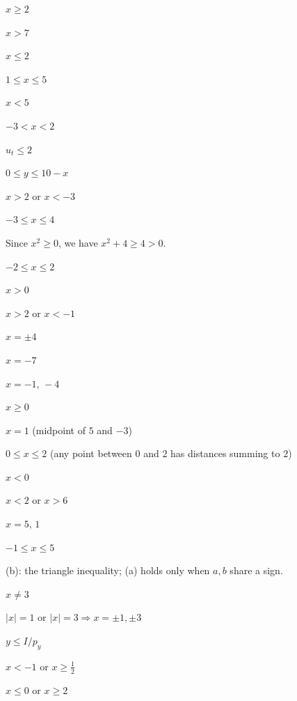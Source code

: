 \begin{solutions}
  \item $x\ge 2$
  \item $x>7$
  \item $x\le 2$
  \item $1\le x\le 5$
  \item $x<5$
  \item $-3<x<2$
  \item $u_{t}\le 2$
  \item $0\le y\le 10-x$
  \item $x>2$ or $x<-3$
  \item $-3\le x\le 4$
  \item Since $x^{2}\ge 0$, we have $x^{2}+4\ge 4>0$.
  \item $-2\le x\le 2$
  \item $x>0$
  \item $x>2$ or $x<-1$
  \item $x=\pm 4$
  \item $x=-7$
  \item $x=-1,\,-4$
  \item $x\ge 0$
  \item $x=1$ (midpoint of $5$ and $-3$)
  \item $0\le x\le 2$ (any point between $0$ and $2$ has distances summing
        to $2$)
  \item $x<0$
  \item $x<2$ or $x>6$
  \item $x=5,\,1$
  \item $-1\le x\le 5$
  \item (b): the triangle inequality; (a) holds only when $a,b$ share a
        sign.
  \item $x\neq 3$
  \item $|x|=1$ or $|x|=3\Rightarrow x=\pm1,\pm3$
  \item $y\le I/p_{y}$
  \item $x<-1$ or $x\ge\tfrac12$
  \item $x\le 0$ or $x\ge 2$
\end{solutions}
